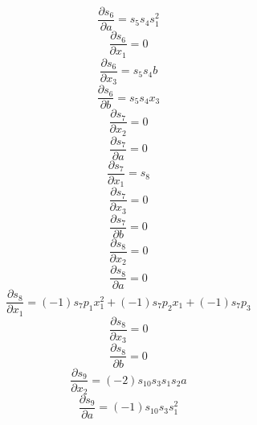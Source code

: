 \documentclass[10pt,a4paper]{article}
\begin{document}
\begin{dmath*}\frac{\partial s_{6}}{\partial a} = s_{5}  s_{4}  s_{1} ^ {2}\end{dmath*}
\begin{dmath*}\frac{\partial s_{6}}{\partial x_{1}} = 0\end{dmath*}
\begin{dmath*}\frac{\partial s_{6}}{\partial x_{3}} = s_{5}  s_{4}  b\end{dmath*}
\begin{dmath*}\frac{\partial s_{6}}{\partial b} = s_{5}  s_{4}  x_{3}\end{dmath*}
\begin{dmath*}\frac{\partial s_{7}}{\partial x_{2}} = 0\end{dmath*}
\begin{dmath*}\frac{\partial s_{7}}{\partial a} = 0\end{dmath*}
\begin{dmath*}\frac{\partial s_{7}}{\partial x_{1}} = s_{8}\end{dmath*}
\begin{dmath*}\frac{\partial s_{7}}{\partial x_{3}} = 0\end{dmath*}
\begin{dmath*}\frac{\partial s_{7}}{\partial b} = 0\end{dmath*}
\begin{dmath*}\frac{\partial s_{8}}{\partial x_{2}} = 0\end{dmath*}
\begin{dmath*}\frac{\partial s_{8}}{\partial a} = 0\end{dmath*}
\begin{dmath*}\frac{\partial s_{8}}{\partial x_{1}} = \left(-1\right)  s_{7}  p_{1}  x_{1} ^ {2} + \left(-1\right)  s_{7}  p_{2}  x_{1} + \left(-1\right)  s_{7}  p_{3}\end{dmath*}
\begin{dmath*}\frac{\partial s_{8}}{\partial x_{3}} = 0\end{dmath*}
\begin{dmath*}\frac{\partial s_{8}}{\partial b} = 0\end{dmath*}
\begin{dmath*}\frac{\partial s_{9}}{\partial x_{2}} = \left(-2\right)  s_{10}  s_{3}  s_{1}  s_{2}  a\end{dmath*}
\begin{dmath*}\frac{\partial s_{9}}{\partial a} = \left(-1\right)  s_{10}  s_{3}  s_{1} ^ {2}\end{dmath*}
\end{document}
